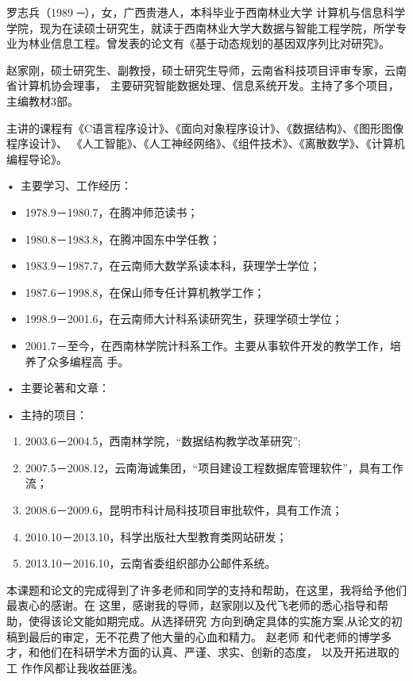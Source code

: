 \documentclass{swfuthesism}
\begin{document}
\doublespacing

\begin{authorInfo}
  罗志兵（1989 ─），女，广西贵港人，本科毕业于西南林业大学
  计算机与信息科学学院，现为在读硕士研究生，就读于西南林业大学大数据与智能工程学院，所学专
  业为林业信息工程。曾发表的论文有《基于动态规划的基因双序列比对研究》。
\end{authorInfo}

\begin{advisorInfo}
  赵家刚，硕士研究生、副教授，硕士研究生导师，云南省科技项目评审专家，云南省计算机协会理事，
  主要研究智能数据处理、信息系统开发。主持了多个项目，主编教材3部。

  主讲的课程有《C语言程序设计》、《面向对象程序设计》、《数据结构》、《图形图像程序设计》、
  《人工智能》、《人工神经网络》、《组件技术》、《离散数学》、《计算机编程导论》。

  \noindent{}•\, 主要学习、工作经历：
  \begin{itemize}
  \item[] 1978.9－1980.7，在腾冲师范读书；
  \item[] 1980.8－1983.8，在腾冲固东中学任教；
  \item[] 1983.9－1987.7，在云南师大数学系读本科，获理学士学位；
  \item[] 1987.6－1998.8，在保山师专任计算机教学工作；
  \item[] 1998.9－2001.6，在云南师大计科系读研究生，获理学硕士学位；
  \item[] 2001.7－至今，在西南林学院计科系工作。主要从事软件开发的教学工作，培养了众多编程高
    手。
  \end{itemize}

  \noindent{}•\, 主要论著和文章：
  \begin{refsection}
    \nocite{zjg02,zjg03,zjg07,zjg09,zjg09-2,zjg09-3,zjg09-4,zjg10,zjg11,zjg13}
    \printbibliography[heading=none] 
  \end{refsection}

  \noindent{}•\, 主持的项目：
  \begin{enumerate}
  \item 2003.6－2004.5，西南林学院，``数据结构教学改革研究'';
  \item 2007.5－2008.12，云南海诚集团，``项目建设工程数据库管理软件''，具有工作流；
  \item 2008.6－2009.6，昆明市科计局科技项目审批软件，具有工作流；
  \item 2010.10－2013.10，科学出版社大型教育类网站研发；
  \item 2013.10－2016.10，云南省委组织部办公邮件系统。
  \end{enumerate}
\end{advisorInfo}


\begin{acknowledgment}
  本课题和论文的完成得到了许多老师和同学的支持和帮助，在这里，我将给予他们最衷心的感谢。在
  这里，感谢我的导师，赵家刚以及代飞老师的悉心指导和帮助，使得该论文能如期完成。从选择研究
  方向到确定具体的实施方案,从论文的初稿到最后的审定，无不花费了他大量的心血和精力。 赵老师
  和代老师的博学多才，和他们在科研学术方面的认真、严谨、求实、创新的态度， 以及开拓进取的工
  作作风都让我收益匪浅。
\end{acknowledgment}
\end{document}
